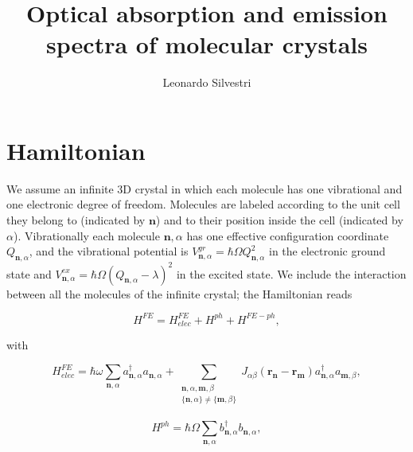 \documentclass[pt12]{article}
\newcommand{\bfr}{\mathbf{r}}
\newcommand{\bfn}{\mathbf{n}}
\newcommand{\bfm}{\mathbf{m}}
\begin{document}
%

\title{Optical absorption and emission spectra of molecular crystals}
\author{Leonardo Silvestri}
\maketitle



\section{Hamiltonian}

We assume an infinite 3D crystal in which each molecule has one
vibrational and one electronic degree of freedom. Molecules are
labeled according to the unit cell they belong to (indicated by
$\bfn$) and to their position inside the cell (indicated by
$\alpha$). Vibrationally each molecule $\bfn,\alpha$ has one
effective configuration coordinate $Q_{\bfn,\alpha}$, and the
vibrational potential is $V^{gr}_{\bfn,\alpha}=\hbar\Omega
Q_{\bfn,\alpha}^2$ in the electronic ground state and
$V^{ex}_{\bfn,\alpha}=\hbar\Omega\left(Q_{\bfn,\alpha}-\lambda\right)^2$
in the excited state. We include the interaction between all the
molecules of the infinite crystal; the Hamiltonian reads

\begin{equation}\label{H}
H^{FE}=H^{FE}_{elec}+H^{ph}+H^{FE-ph},
\end{equation}

with

\begin{equation}\label{H_FE}
H^{FE}_{elec}=\hbar\omega\sum_{\bfn,\alpha}a^\dagger_{\bfn,\alpha}a_{\bfn,\alpha}
+\sum_{                         \begin{array}{c}
                                  \bfn,\alpha,\bfm,\beta \\
                                  \{\bfn,\alpha\} \neq \{\bfm,\beta\} \\
                                \end{array}
}  J_{\alpha\beta}(\bfr_{\bfn}-\bfr_{\bfm})
a^\dagger_{\bfn,\alpha}a_{\bfm,\beta},
\end{equation}

\begin{equation}\label{H_ph}
H^{ph}=\hbar\Omega\sum_{\bfn,\alpha}b^\dagger_{\bfn,\alpha}b_{\bfn,\alpha},
\end{equation}
\end{document}
